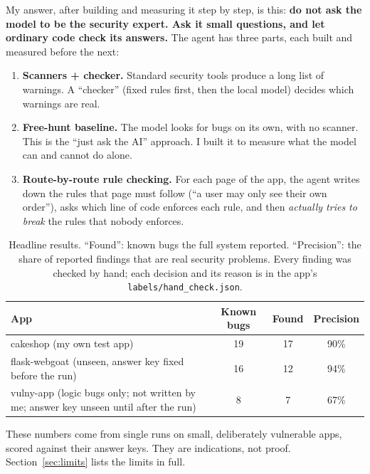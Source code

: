 \documentclass[11pt,a4paper]{article}
\newcommand{\code}[1]{\texttt{#1}}
\begin{document}
My answer, after building and measuring it step by step, is this: \textbf{do not ask the model to be the
security expert. Ask it small questions, and let ordinary code check its answers.} The agent has three
parts, each built and measured before the next:

\begin{enumerate}
  \item \textbf{Scanners + checker.} Standard security tools produce a long list of warnings. A
        ``checker'' (fixed rules first, then the local model) decides which warnings are real.
  \item \textbf{Free-hunt baseline.} The model looks for bugs on its own, with no scanner. This is the
        ``just ask the AI'' approach. I built it to measure what the model can and cannot do alone.
  \item \textbf{Route-by-route rule checking.} For each page of the app, the agent writes down the rules
        that page must follow (``a user may only see their own order''), asks which line of code
        enforces each rule, and then \emph{actually tries to break} the rules that nobody enforces.
\end{enumerate}

\begin{table}[H]
\centering
\caption{Headline results. ``Found'': known bugs the full system reported. ``Precision'': the share of
reported findings that are real security problems. Every finding was checked by hand; each decision and its
reason is in the app's \code{labels/hand\_check.json}.}
\label{tab:headline}
\begin{tabularx}{\linewidth}{@{}Y c c c@{}}
\toprule
\textbf{App} & \textbf{Known bugs} & \textbf{Found} & \textbf{Precision} \\
\midrule
cakeshop (my own test app) & 19 & 17 & 90\% \\
flask-webgoat (unseen, answer key fixed before the run) & 16 & 12 & 94\% \\
vulny-app (logic bugs only; not written by me; answer key unseen until after the run) & 8 & 7 & 67\% \\
\bottomrule
\end{tabularx}
\end{table}

These numbers come from single runs on small, deliberately vulnerable apps, scored against their answer
keys. They are indications, not proof. Section~\ref{sec:limits} lists the limits in full.

\end{document}
